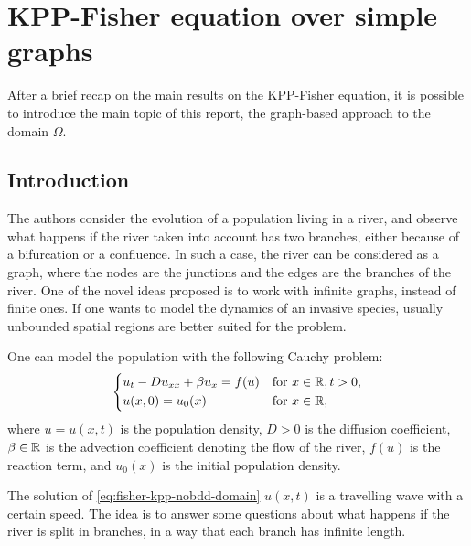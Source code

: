 \section{KPP-Fisher equation over simple graphs}
After a brief recap on the main results on the KPP-Fisher equation, it is possible to introduce the main topic of this report, the graph-based approach to the domain \(\Omega\). 
\subsection{Introduction}
The authors consider the evolution of a population living in a river, and observe what happens if the river taken into account has two branches, either because of a bifurcation or a confluence. In such a case, the river can be considered as a graph, where the nodes are the junctions and the edges are the branches of the river. One of the novel ideas proposed is to work with infinite graphs, instead of finite ones. If one wants to model the dynamics of an invasive species, usually unbounded spatial regions are better suited for the problem.

One can model the population with the following Cauchy problem:
\begin{equation}
    \begin{dcases}
        u_t - Du_{xx} + \beta u_x = f(u) & \text{for } x \in \mathbb{R}, t > 0, \\
        u(x, 0) = u_0(x) & \text{for } x \in \mathbb{R},
    \end{dcases}
    \label{eq:fisher-kpp-nobdd-domain}
\end{equation}
where \(u = u(x, t)\) is the population density, \(D > 0\) is the diffusion coefficient, \(\beta \in \mathbb{R}\) is the advection coefficient denoting the flow of the river, \(f(u)\) is the reaction term, and \(u_0(x)\) is the initial population density.

The solution of \eqref{eq:fisher-kpp-nobdd-domain} \(u(x, t)\) is a travelling wave with a certain speed. The idea is to answer some questions about what happens if the river is split in branches, in a way that each branch has infinite length. 

